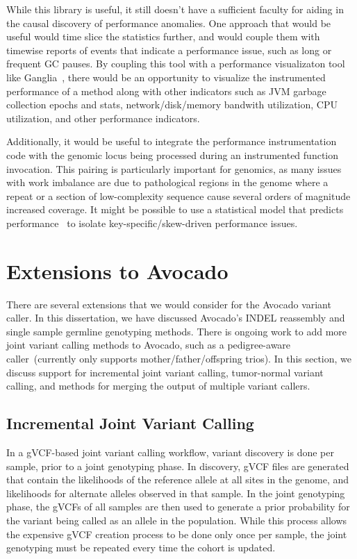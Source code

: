 \documentclass[phd]{ucbthesis}
\begin{document}
While this library is useful, it still doesn't have a sufficient faculty for
aiding in the causal discovery of performance anomalies. One approach that would
be useful would time slice the statistics further, and would couple them with
timewise reports of events that indicate a performance issue, such as long or
frequent GC pauses. By coupling this tool with a performance visualizaton
tool like {Ganglia}~\cite{massie04}, there would be an opportunity to
visualize the instrumented performance of a method along with other indicators
such as JVM garbage collection epochs and stats, network/disk/memory bandwith
utilization, CPU utilization, and other performance indicators.

Additionally, it would be useful to integrate the performance
instrumentation code with the genomic locus being processed during an
instrumented function invocation. This pairing is particularly
important for genomics, as many issues with work imbalance are due to pathological
regions in the genome where a repeat or a section of low-complexity sequence
cause several orders of magnitude increased coverage. It might be possible to use a
statistical model that predicts performance~\cite{venkataraman16ernest} to isolate
key-specific/skew-driven performance issues.

\section{Extensions to {Avocado}}
\label{sec:extending-avocado}

There are several extensions that we would consider for the {Avocado}
variant caller. In this dissertation, we have discussed {Avocado}'s
INDEL reassembly and single sample germline genotyping methods. There is ongoing
work to add more joint variant calling methods to {Avocado}, such as a
pedigree-aware caller~(currently only supports mother/father/offspring trios).
In this section, we discuss support for incremental joint variant calling,
tumor-normal variant calling, and methods for merging the output of multiple
variant callers.

\subsection{Incremental Joint Variant Calling}
\label{sec:incremental-joint-variant-calling}

In a gVCF-based joint variant calling workflow, variant discovery is done per
sample, prior to a joint genotyping phase. In discovery, gVCF files are
generated that contain the likelihoods of the reference allele at all sites in
the genome, and likelihoods for alternate alleles observed in that sample. In
the joint genotyping phase, the gVCFs of all samples are then used to generate
a prior probability for the variant being called as an allele in the population.
While this process allows the expensive gVCF creation process to be done only
once per sample, the joint genotyping must be repeated every time the cohort is
updated.
\end{document}
